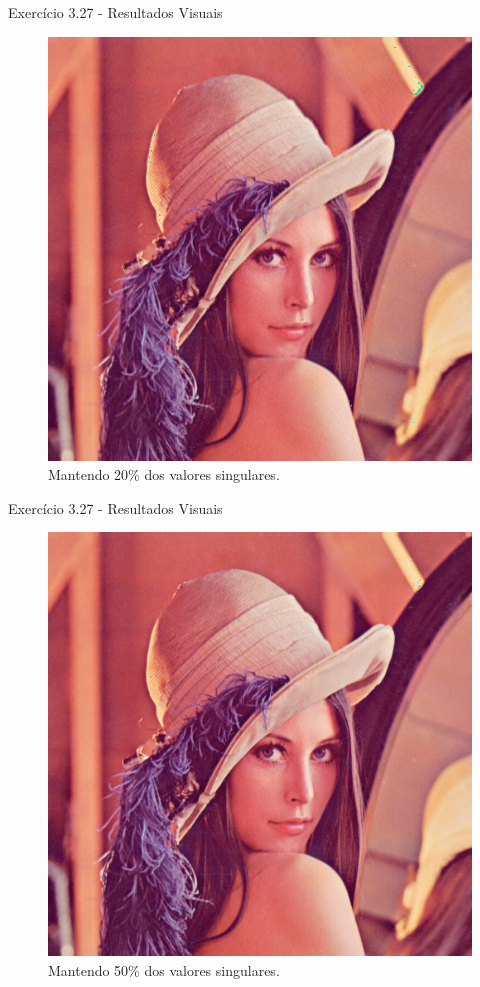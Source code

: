 \documentclass{beamer}
\begin{document}
\begin{frame}{Exerc\'icio 3.27 - Resultados Visuais}
  \begin{figure}
    \centering
    \includegraphics[width=0.65\columnwidth]{Lenna_128.png}
    \caption{Mantendo 20\% dos valores singulares.}
  \end{figure}
\end{frame}

\begin{frame}{Exerc\'icio 3.27 - Resultados Visuais}
  \begin{figure}
    \centering
    \includegraphics[width=0.65\columnwidth]{Lenna_256.png}
    \caption{Mantendo 50\% dos valores singulares.}
  \end{figure}
\end{frame}
\end{document}
